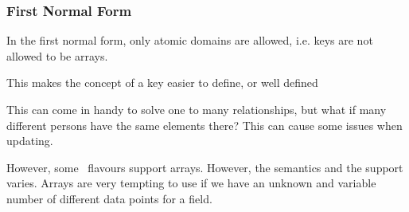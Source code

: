 \subsubsection{First Normal Form}
In the first normal form, only atomic domains are allowed, i.e. keys are not allowed to be arrays.

\inlineintuition This makes the concept of a key easier to define, or well defined

This can come in handy to solve one to many relationships, but what if many different persons have the same elements there?
This can cause some issues when updating.

However, some \sql\ flavours support arrays. However, the semantics and the support varies.
Arrays are very tempting to use if we have an unknown and variable number of different data points for a field.
